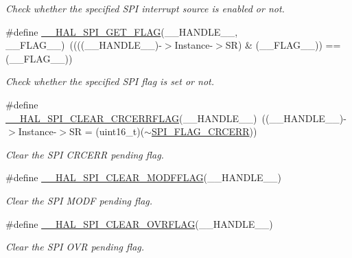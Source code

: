 \begin{DoxyCompactItemize}
\begin{DoxyCompactList}\small\item\em Check whether the specified S\+PI interrupt source is enabled or not. \end{DoxyCompactList}\item 
\#define \hyperlink{group___s_p_i___exported___macros_gaa0bbe5fb55f93fd277ddb6acf58cec53}{\+\_\+\+\_\+\+H\+A\+L\+\_\+\+S\+P\+I\+\_\+\+G\+E\+T\+\_\+\+F\+L\+AG}(\+\_\+\+\_\+\+H\+A\+N\+D\+L\+E\+\_\+\+\_\+,  \+\_\+\+\_\+\+F\+L\+A\+G\+\_\+\+\_\+)~((((\+\_\+\+\_\+\+H\+A\+N\+D\+L\+E\+\_\+\+\_\+)-\/$>$Instance-\/$>$SR) \& (\+\_\+\+\_\+\+F\+L\+A\+G\+\_\+\+\_\+)) == (\+\_\+\+\_\+\+F\+L\+A\+G\+\_\+\+\_\+))
\begin{DoxyCompactList}\small\item\em Check whether the specified S\+PI flag is set or not. \end{DoxyCompactList}\item 
\#define \hyperlink{group___s_p_i___exported___macros_gad1cb4100b67726531ad426d300f4cd26}{\+\_\+\+\_\+\+H\+A\+L\+\_\+\+S\+P\+I\+\_\+\+C\+L\+E\+A\+R\+\_\+\+C\+R\+C\+E\+R\+R\+F\+L\+AG}(\+\_\+\+\_\+\+H\+A\+N\+D\+L\+E\+\_\+\+\_\+)~((\+\_\+\+\_\+\+H\+A\+N\+D\+L\+E\+\_\+\+\_\+)-\/$>$Instance-\/$>$SR = (uint16\+\_\+t)($\sim$\hyperlink{group___s_p_i___flags__definition_ga30fb6af50e1f3c61cb9de76b0101c889}{S\+P\+I\+\_\+\+F\+L\+A\+G\+\_\+\+C\+R\+C\+E\+RR}))
\begin{DoxyCompactList}\small\item\em Clear the S\+PI C\+R\+C\+E\+RR pending flag. \end{DoxyCompactList}\item 
\#define \hyperlink{group___s_p_i___exported___macros_ga6c88becbe528c542156bc201622efba2}{\+\_\+\+\_\+\+H\+A\+L\+\_\+\+S\+P\+I\+\_\+\+C\+L\+E\+A\+R\+\_\+\+M\+O\+D\+F\+F\+L\+AG}(\+\_\+\+\_\+\+H\+A\+N\+D\+L\+E\+\_\+\+\_\+)
\begin{DoxyCompactList}\small\item\em Clear the S\+PI M\+O\+DF pending flag. \end{DoxyCompactList}\item 
\#define \hyperlink{group___s_p_i___exported___macros_gaf6af33b1c5d334b9fe7bb778c5b6442e}{\+\_\+\+\_\+\+H\+A\+L\+\_\+\+S\+P\+I\+\_\+\+C\+L\+E\+A\+R\+\_\+\+O\+V\+R\+F\+L\+AG}(\+\_\+\+\_\+\+H\+A\+N\+D\+L\+E\+\_\+\+\_\+)
\begin{DoxyCompactList}\small\item\em Clear the S\+PI O\+VR pending flag. \end{DoxyCompactList}\item 

\end{DoxyCompactItemize}
